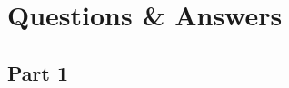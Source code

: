 
\section{Questions \& Answers}\label{sec:qa}

    \subsection{Part 1}\label{subsec:part1_qa}
        \lipsum[1]
